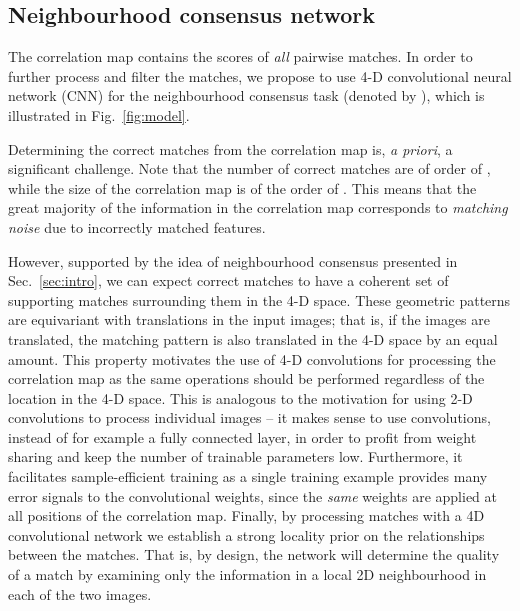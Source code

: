 \documentclass{article}
\begin{document}
\subsection{Neighbourhood consensus network}
The correlation map contains the scores of \emph{all} pairwise matches. In order to further process and filter the matches, we propose to use 4-D convolutional neural network (CNN) for the neighbourhood consensus task (denoted by ), which is  illustrated in Fig.~\ref{fig:model}.

Determining the correct matches from the correlation map is, \emph{a priori}, a significant challenge. Note that the number of correct matches are of order of , while the size of the correlation map is of the order of . This means that the great majority of the information in the correlation map corresponds to \emph{matching noise} due to incorrectly matched features.

However, supported by the idea of neighbourhood consensus presented in Sec.~\ref{sec:intro}, we can expect correct matches to have a coherent set of supporting matches surrounding them in the 4-D space. These geometric patterns are equivariant with translations in the input images; that is, if the images are translated, the matching pattern is also translated in the 4-D space by an equal amount. This property motivates the use of 4-D convolutions for processing the correlation map as the same operations should be performed regardless of the location in the 4-D space. This is analogous to the motivation for using 2-D convolutions to process individual images -- it makes sense to use convolutions, instead of for example a fully connected layer, in order to profit from weight sharing and keep the number of trainable parameters low. Furthermore, it facilitates sample-efficient training as a single training example provides many error signals to the convolutional weights, since the \emph{same} weights are applied at all positions of the correlation map. Finally, by processing matches with a 4D convolutional network we establish a strong locality prior on the relationships between the matches. That is, by design, the network will determine the quality of a match by examining only the information in a local 2D neighbourhood in each of the two images.
\end{document}
